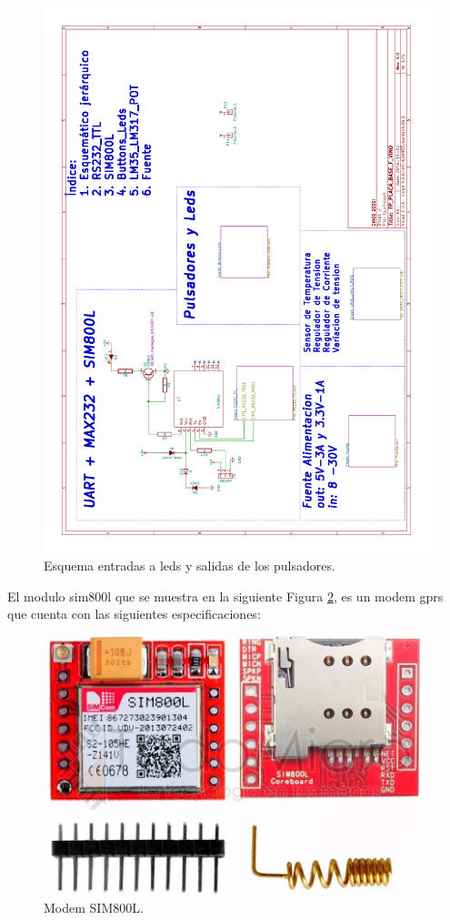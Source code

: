 \begin{figure}[h]
      \centering
      \includegraphics[page=5,scale=0.3,angle=270]{./Figures/schematic.pdf}
      \caption{Esquema entradas a leds y salidas de los pulsadores.}
      \label{fig:pul_leds}
\end{figure}


El modulo sim800l que se muestra en la siguiente Figura \ref{fig:sim800l}, es un modem gprs que cuenta con las siguientes especificaciones:

\begin{figure}[h]
      \centering
      \includegraphics[scale=0.2]{./Figures/sim800.png}
      \caption{Modem SIM800L.}
      \label{fig:sim800l}
\end{figure}

